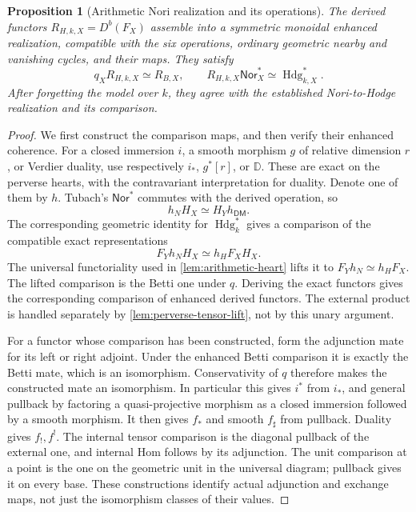 \documentclass[11pt]{article}
\numberwithin{equation}{section}
\newtheorem{proposition}[proposition]{Proposition}
\theoremstyle{definition}
\theoremstyle{remark}
\newcommand{\DD}{\mathbb D}
\begin{document}
\begin{proposition}[Arithmetic Nori realization and its operations]
\label{prop:arithmetic-Nori-operations}
The derived functors $R_{H,k,X}=D^b(F_X)$ assemble into a symmetric
monoidal enhanced realization, compatible with the six operations,
ordinary geometric nearby and vanishing cycles, and their maps.
They satisfy
\[
 q_XR_{H,k,X}\simeq R_{B,X},\qquad
 R_{H,k,X}\mathsf{Nor}_X^*\simeq\operatorname{Hdg}_{k,X}^*.
\]
After forgetting the model over $k$, they agree with the established
Nori-to-Hodge realization and its comparison.
\end{proposition}
\begin{proof}
We first construct the comparison maps, and then verify their enhanced
coherence. For a closed immersion $i$, a smooth morphism $g$ of relative
dimension $r$, or Verdier duality, use respectively $i_*$, $g^*[r]$, or
$\DD$. These are exact on the perverse hearts, with the contravariant
interpretation for duality. Denote one of them by $h$. Tubach's
$\mathsf{Nor}^*$ commutes with the derived operation, so
\[
 h_NH_X\simeq H_Yh_{\mathsf{DM}}.
\]
The corresponding geometric identity for $\operatorname{Hdg}_k^*$
gives a comparison of the compatible exact representations
\[
 F_Yh_NH_X\simeq h_HF_XH_X.
\]
The universal functoriality used in \cref{lem:arithmetic-heart} lifts
it to $F_Yh_N\simeq h_HF_X$. The lifted comparison is the Betti one
under $q$. Deriving the exact functors gives the corresponding
comparison of enhanced derived functors. The external product is
handled separately by \cref{lem:perverse-tensor-lift}, not by this
unary argument.

For a functor whose comparison has been constructed, form the
adjunction mate for its left or right adjoint. Under the enhanced Betti
comparison it is exactly the Betti mate, which is an isomorphism.
Conservativity of $q$ therefore makes the constructed mate an
isomorphism. In particular this gives $i^*$ from $i_*$, and general
pullback by factoring a quasi-projective morphism as a closed immersion
followed by a smooth morphism. It then gives $f_*$ and smooth
$f_\sharp$ from pullback. Duality gives $f_!,f^!$. The internal tensor
comparison is the diagonal pullback of the external one, and internal
Hom follows by its adjunction. The unit comparison at a point is the
one on the geometric unit in the universal diagram; pullback gives it
on every base. These constructions identify actual adjunction and
exchange maps, not just the isomorphism classes of their values.


\end{proof}
\end{document}
